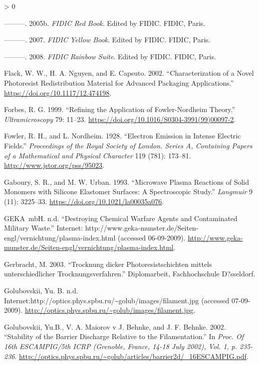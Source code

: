 \documentclass[
  10pt,
  twoside]{article}
\newlength{\cslhangindent}
\newenvironment{CSLReferences}[2] %
 {%
  \setlength{\parindent}{0pt}
  \ifodd #1 \everypar{\setlength{\hangindent}{\cslhangindent}}\ignorespaces\fi
  \ifnum #2 > 0
  \setlength{\parskip}{#2\baselineskip}
  \fi
 }%
 {}
\begin{document}
\begin{CSLReferences}{1}{0}
\leavevmode\hypertarget{ref-FIDICred}{}%
---------. 2005b. \emph{FIDIC Red Book}. Edited by FIDIC. FIDIC, Paris.

\leavevmode\hypertarget{ref-FIDICyellow}{}%
---------. 2007. \emph{FIDIC Yellow Book}. Edited by FIDIC. FIDIC, Paris.

\leavevmode\hypertarget{ref-FIDICrainbow}{}%
---------. 2008. \emph{FIDIC Rainbow Suite}. Edited by FIDIC. FIDIC, Paris.

\leavevmode\hypertarget{ref-Flac02}{}%
Flack, W. W., H. A. Nguyen, and E. Capsuto. 2002. {``Characterization of a Novel Photoresist Redistribution Material for Advanced Packaging Applications.''} \url{https://doi.org/10.1117/12.474198}.

\leavevmode\hypertarget{ref-Forb1999}{}%
Forbes, R. G. 1999. {``Refining the Application of Fowler-Nordheim Theory.''} \emph{Ultramicroscopy} 79: 11--23. \url{https://doi.org/10.1016/S0304-3991(99)00097-2}.

\leavevmode\hypertarget{ref-Fowl1928}{}%
Fowler, R. H., and L. Nordheim. 1928. {``Electron Emission in Intense Electric Fields.''} \emph{Proceedings of the Royal Society of London. Series A, Containing Papers of a Mathematical and Physical Character} 119 (781): 173--81. \url{http://www.jstor.org/pss/95023}.

\leavevmode\hypertarget{ref-Gabo1993}{}%
Gaboury, S. R., and M. W. Urban. 1993. {``Microwave Plasma Reactions of Solid Monomers with Silicone Elastomer Surfaces: A Spectroscopic Study.''} \emph{Langmuir} 9 (11): 3225--33. \url{https://doi.org/10.1021/la00035a076}.

\leavevmode\hypertarget{ref-GEKA}{}%
GEKA~mbH. n.d. {``Destroying Chemical Warfare Agents and Contaminated Military Waste.''} Internet: http://www.geka-munster.de/Seiten-engl/vernichtung/plasma-index.html (accessed 06-09-2009). \url{http://www.geka-munster.de/Seiten-engl/vernichtung/plasma-index.html}.

\leavevmode\hypertarget{ref-Gerb03}{}%
Gerbracht, M. 2003. {``{Trocknung dicker Photoresistschichten mittels unterschiedlicher Trocknungsverfahren}.''} Diplomarbeit, Fachhochschule D?sseldorf.

\leavevmode\hypertarget{ref-Filament}{}%
Golubovskii, Yu. B. n.d. Internet:{}http://optics.phys.spbu.ru/\textasciitilde golub/images/filament.jpg (accessed 07-09-2009). \url{http://optics.phys.spbu.ru/~golub/images/filament.jpg}.

\leavevmode\hypertarget{ref-Golub02-2}{}%
Golubovskii, Yu.B., V. A. Maiorov v J. Behnke, and J. F. Behnke. 2002. {``Stability of the Barrier Discharge Relative to the Filamentation.''} In \emph{Proc. Of 16th ESCAMPIG/5th ICRP (Grenoble, France, 14-18 July 2002), Vol. 1, p. 235-236}. \url{http://optics.phys.spbu.ru/~golub/articles/barrier2d/_16ESCAMPIG.pdf}.


\end{CSLReferences}
\end{document}
